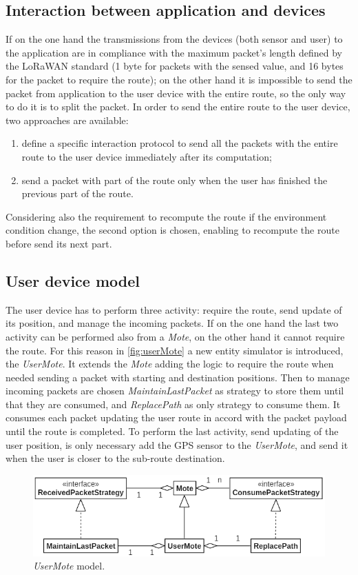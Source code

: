 \subsection*{Interaction between application and devices}
If on the one hand the transmissions from the devices (both sensor and user) to the application are in compliance with the maximum packet's length defined by the LoRaWAN standard (1 byte for packets with the sensed value, and 16 bytes for the packet to require the route); on the other hand it is impossible to send the packet from application to the user device with the entire route, so the only way to do it is to split the packet.
In order to send the entire route to the user device, two approaches are available: 
\begin{enumerate}
    \item define a specific interaction protocol to send all the packets with the entire route to the user device immediately after its computation;
    \item send a packet with part of the route only when the user has finished the previous part of the route.
\end{enumerate}
Considering also the requirement to recompute the route if the environment condition change, the second option is chosen, enabling to recompute the route before send its next part.

\subsection*{User device model}
The user device has to perform three activity: require the route, send update of its position, and manage the incoming packets.
If on the one hand the last two activity can be performed also from a \textit{Mote}, on the other hand it cannot require the route.
For this reason in \autoref{fig:userMote} a new entity simulator is introduced, the \textit{UserMote}. 
It extends the \textit{Mote} adding the logic to require the route when needed sending a packet with starting and destination positions.
Then to manage incoming packets are chosen \textit{MaintainLastPacket} as strategy to store them until that they are consumed, and \textit{ReplacePath} as only strategy to consume them.
It consumes each packet updating the user route in accord with the packet payload until the route is completed.
To perform the last activity, send updating of the user position, is only necessary add the GPS sensor to the \textit{UserMote}, and send it when the user is closer to the sub-route destination.
% 
\begin{figure}[h]
    \centering
    \includegraphics{figures/userMote.png}
    \caption{\textit{UserMote} model.}
    \label{fig:userMote}
\end{figure}
% 

